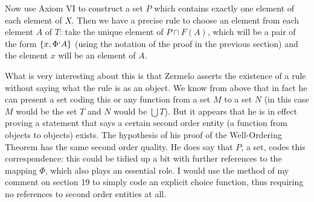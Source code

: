 \documentclass[12pt]{article}
\begin{document}
\begin{enumerate}
Now use Axiom VI to construct a set $P$ which contains exactly one element of each element of $X$.  Then we have a precise rule to choose an element
from each element $A$ of $T$:  take the unique element of $P \cap F(A)$, which will be a pair of the form $\{x,\Phi`A\}$ (using the notation of the proof in the previous section)
and the element $x$ will be an element of $A$.

What is very interesting about this is that Zermelo asserts the existence of a rule without saying what the rule is as an object.  We know from above that in fact
he can present a set coding this or any function from a set $M$ to a set $N$ (in this case $M$ would be the set $T$ and $N$ would be $\bigcup T$).  But it appears that he is in effect proving a statement that says a certain second order entity (a function from objects to objects) exists.  The hypothesis of his proof of the Well-Ordering Theorem has the same second order quality.  He does say that $P$, a set, codes this correspondence:  this could be tidied up a bit with further references to the mapping $\Phi$, which also plays an essential role.  I would use the method of my comment on section 19 to simply code an explicit choice function, thus requiring no references to second order entities at all.





\end{enumerate}
\end{document}
